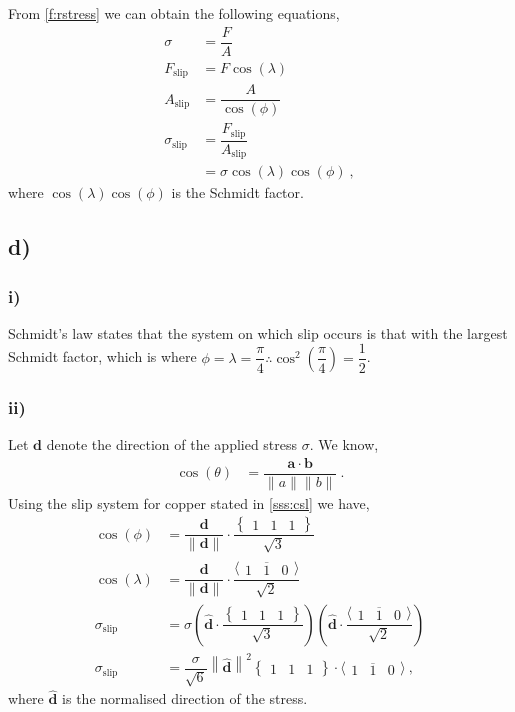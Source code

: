 \documentclass[a4paper]{article}
\begin{document}
	From \cref{f:rstress} we can obtain the following equations,
	\begin{subequations}
		\begin{align}
			\sigma &= \dfrac{F}{A} \\
			F_{\textrm{slip}} &= F \cos(\lambda) \\
			A_{\textrm{slip}} &= \dfrac{A}{\cos(\phi)} \\
			\sigma_{\textrm{slip}} &= \dfrac{F_{\textrm{slip}}}{A_{\textrm{slip}}} \\
			&= \sigma \cos(\lambda) \cos(\phi)~,
		\end{align}
	\end{subequations}
	where $\cos(\lambda) \cos(\phi)$ is the Schmidt factor.
	\subsection{d)}
	\subsubsection{i)}
	Schmidt's law states that the system on which slip occurs is that with the largest Schmidt factor, which is where $\phi = \lambda = \dfrac{\pi}{4} \therefore \cos^{2}\left(\dfrac{\pi}{4}\right) = \dfrac{1}{2}$.
	\subsubsection{ii)}
	Let $\bm{d}$ denote the direction of the applied stress $\sigma$. We know,
	\begin{align}
		\cos(\theta) &= \dfrac{\bm{a} \cdot \bm{b}}{\|a\| \|b\|}~.
	\end{align}
	Using the slip system for copper stated in \cref{sss:csl} we have,
	\begin{subequations}
		\begin{align}
			\cos(\phi) &= \dfrac{\bm{d}}{\|\bm{d}\|} \cdot \dfrac{\begin{Bmatrix} 1 & 1 & 1\end{Bmatrix}}{ \sqrt{3}}\\
			\cos(\lambda) &= \dfrac{\bm{d}}{\|\bm{d}\|} \cdot \dfrac{\langle\begin{matrix} 1 & \overline{1} & 0\end{matrix}\rangle}{\sqrt{2}}\\
			\sigma_{\textrm{slip}} &= \sigma \left(\bm{\hat{d}} \cdot \dfrac{\begin{Bmatrix} 1 & 1 & 1\end{Bmatrix}}{ \sqrt{3}}\right) \left(\bm{\hat{d}} \cdot \dfrac{\langle\begin{matrix} 1 & \overline{1} & 0\end{matrix}\rangle}{\sqrt{2}}\right)\\
			\sigma_{\textrm{slip}} &= \dfrac{\sigma}{\sqrt{6}} \left\|\bm{\hat{d}}\right\|^{2} \begin{Bmatrix} 1 & 1 & 1\end{Bmatrix} \cdot \langle\begin{matrix} 1 & \overline{1} & 0\end{matrix}\rangle~,
		\end{align}
	\end{subequations}
	where $\bm{\hat{d}}$ is the normalised direction of the stress.
\end{document}
